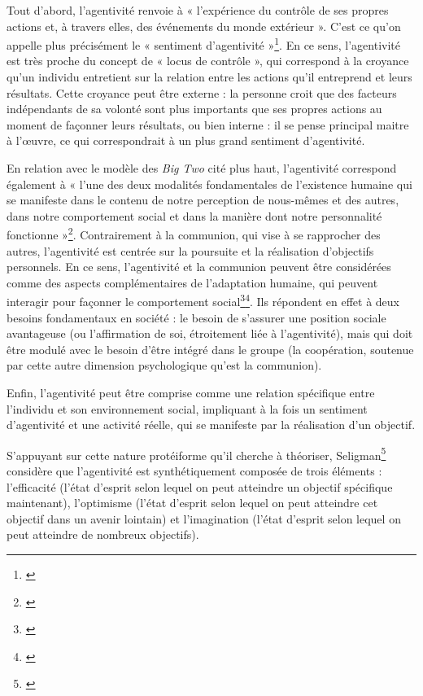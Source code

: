 Tout d'abord, l’agentivité renvoie à « l'expérience du contrôle de ses propres actions et, à travers elles, des événements du monde extérieur ». C’est ce qu'on appelle plus précisément le « sentiment d’agentivité »\footnote{\cite{haggard_p_chambon_v_sense_nodate}}. En ce sens, l’agentivité est très proche du concept de « locus de contrôle », qui correspond à la croyance qu’un individu entretient sur la relation entre les actions qu’il entreprend et leurs résultats. Cette croyance peut être externe : la personne croit que des facteurs indépendants de sa volonté sont plus importants que ses propres actions au moment de façonner leurs résultats, ou bien interne : il se pense principal maitre à l’œuvre, ce qui correspondrait à un plus grand sentiment d’agentivité.

En relation avec le modèle des \textit{Big Two} cité plus haut, l’agentivité correspond également à « l'une des deux modalités fondamentales de l'existence humaine qui se manifeste dans le contenu de notre perception de nous-mêmes et des autres, dans notre comportement social et dans la manière dont notre personnalité fonctionne »\footnote{\cite{bakan_duality_1966}}. Contrairement à la communion, qui vise à se rapprocher des autres, l’agentivité est centrée sur la poursuite et la réalisation d'objectifs personnels. En ce sens, l’agentivité et la communion peuvent être considérées comme des aspects complémentaires de l'adaptation humaine, qui peuvent interagir pour façonner le comportement social\footnote{\cite{locke_agency_2014}}\footnote{\cite{wiggins_agency_1991}}. Ils répondent en effet à deux besoins fondamentaux en société : le besoin de s'assurer une position sociale avantageuse (ou l’affirmation de soi, étroitement liée à l’agentivité), mais qui doit être modulé avec le besoin d'être intégré dans le groupe (la coopération, soutenue par cette autre dimension psychologique qu’est la communion).

Enfin, l’agentivité peut être comprise comme une relation spécifique entre l'individu et son environnement social, impliquant à la fois un sentiment d’agentivité et une activité réelle, qui se manifeste par la réalisation d'un objectif.

S'appuyant sur cette nature protéiforme qu’il cherche à théoriser, Seligman\footnote{\cite{seligman_m_maymin_p_agency_2022}} considère que l’agentivité est synthétiquement composée de trois éléments : l'efficacité (l'état d'esprit selon lequel on peut atteindre un objectif spécifique maintenant), l'optimisme (l'état d'esprit selon lequel on peut atteindre cet objectif dans un avenir lointain) et l'imagination (l'état d'esprit selon lequel on peut atteindre de nombreux objectifs).

